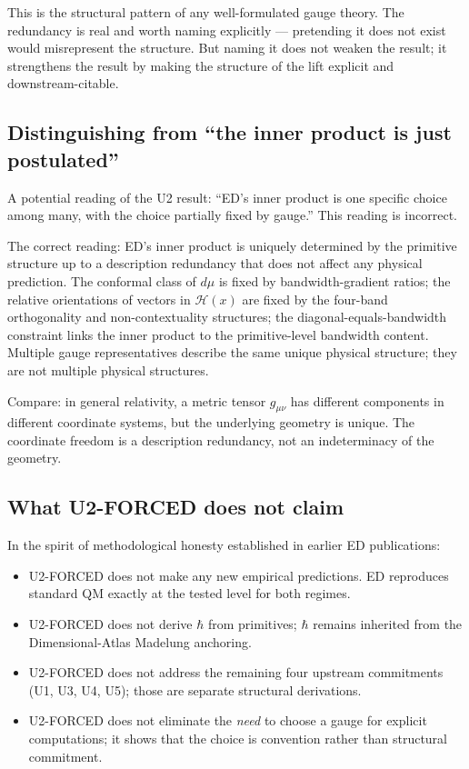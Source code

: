 \documentclass[11pt,a4paper]{article}
\begin{document}
This is the structural pattern of any well-formulated gauge theory. The redundancy is real and worth naming explicitly --- pretending it does not exist would misrepresent the structure. But naming it does not weaken the result; it strengthens the result by making the structure of the lift explicit and downstream-citable.

\subsection{Distinguishing from ``the inner product is just postulated''}

A potential reading of the U2 result: ``ED's inner product is one specific choice among many, with the choice partially fixed by gauge.'' This reading is incorrect.

The correct reading: ED's inner product is uniquely determined by the primitive structure up to a description redundancy that does not affect any physical prediction. The conformal class of $d\mu$ is fixed by bandwidth-gradient ratios; the relative orientations of vectors in $\mathcal{H}(x)$ are fixed by the four-band orthogonality and non-contextuality structures; the diagonal-equals-bandwidth constraint links the inner product to the primitive-level bandwidth content. Multiple gauge representatives describe the same unique physical structure; they are not multiple physical structures.

Compare: in general relativity, a metric tensor $g_{\mu\nu}$ has different components in different coordinate systems, but the underlying geometry is unique. The coordinate freedom is a description redundancy, not an indeterminacy of the geometry.

\subsection{What U2-FORCED does not claim}

In the spirit of methodological honesty established in earlier ED publications:

\begin{itemize}
  \item U2-FORCED does not make any new empirical predictions. ED reproduces standard QM exactly at the tested level for both regimes.
  \item U2-FORCED does not derive $\hbar$ from primitives; $\hbar$ remains inherited from the Dimensional-Atlas Madelung anchoring.
  \item U2-FORCED does not address the remaining four upstream commitments (U1, U3, U4, U5); those are separate structural derivations.
  \item U2-FORCED does not eliminate the \emph{need} to choose a gauge for explicit computations; it shows that the choice is convention rather than structural commitment.
\end{itemize}
\end{document}
